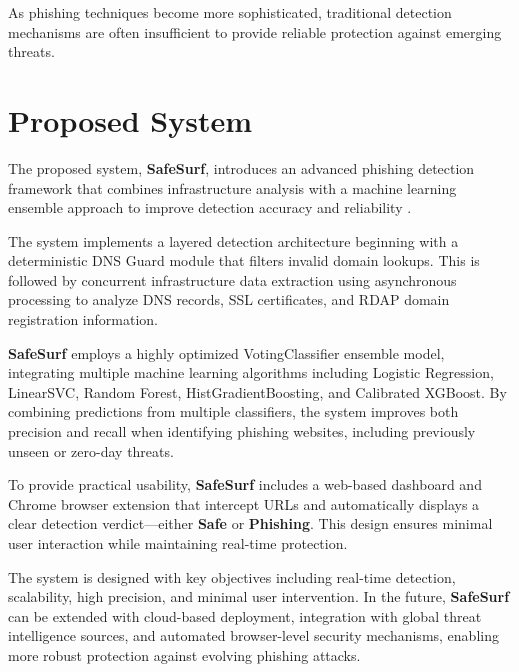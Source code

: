 As phishing techniques become more sophisticated, traditional detection mechanisms are often insufficient to provide reliable protection against emerging threats.

\section{Proposed System}

The proposed system, \textbf{SafeSurf}, introduces an advanced phishing detection framework that combines infrastructure analysis with a machine learning ensemble approach to improve detection accuracy and reliability \cite{ref5}.

The system implements a layered detection architecture beginning with a deterministic DNS Guard module that filters invalid domain lookups. This is followed by concurrent infrastructure data extraction using asynchronous processing to analyze DNS records, SSL certificates, and RDAP domain registration information.

\textbf{SafeSurf} employs a highly optimized VotingClassifier ensemble model, integrating multiple machine learning algorithms including Logistic Regression, LinearSVC, Random Forest, HistGradientBoosting, and Calibrated XGBoost. By combining predictions from multiple classifiers, the system improves both precision and recall when identifying phishing websites, including previously unseen or zero-day threats.

To provide practical usability, \textbf{SafeSurf} includes a web-based dashboard and Chrome browser extension that intercept URLs and automatically displays a clear detection verdict---either \textbf{Safe} or \textbf{Phishing}. This design ensures minimal user interaction while maintaining real-time protection.

The system is designed with key objectives including real-time detection, scalability, high precision, and minimal user intervention. In the future, \textbf{SafeSurf} can be extended with cloud-based deployment, integration with global threat intelligence sources, and automated browser-level security mechanisms, enabling more robust protection against evolving phishing attacks.